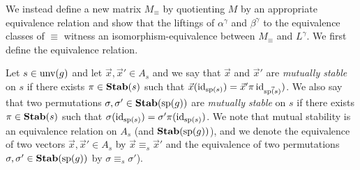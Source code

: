 \documentclass[../paper.tex]{subfiles}
\begin{document}
We instead define a new matrix $M_{\equiv}$ by quotienting $M$ by an appropriate
equivalence relation and show that the liftings of $\alpha^{\gamma}$ and
$\beta^{\gamma}$ to the equivalence classes of $\equiv$ witness an
isomorphism-equivalence between $M_\equiv$ and $L^{\gamma}$. We first define the
equivalence relation.

Let $s \in \text{unv}(g)$ and let $\vec{x}, \vec{x}' \in A_s$ and we say that
$\vec{x}$ and $\vec{x}'$ are \emph{mutually stable} on $s$ if there exists $\pi
\in \text{\textbf{Stab}}(s)$ such that $\vec{x} (\operatorname{id}_{\text{sp}(s)}) = \vec{x}'\pi
\operatorname{id}_{\vec{\text{sp}(s)}})$. We also say that two permutations $\sigma, \sigma' \in
\text{\textbf{Stab}} (\text{sp} (g))$ are \emph{mutually stable} on $s$ if there exists $\pi \in \text{\textbf{Stab}}(s)$
such that $\sigma (\operatorname{id}_{\text{sp}(s)}) = \sigma' \pi (\operatorname{id}_{\text{sp}(s)}) $. We note
that mutual stability is an equivalence relation on $A_s$ (and $\text{\textbf{Stab}} (\text{sp} (g))$),
and we denote the equivalence of two vectors $\vec{x}, \vec{x}' \in A_s$ by
$\vec{x} \equiv_s \vec{x}'$ and the equivalence of two permutations $\sigma,
\sigma' \in \text{\textbf{Stab}} (\text{sp} (g))$ by $\sigma \equiv_s \sigma'$).





\end{document}
